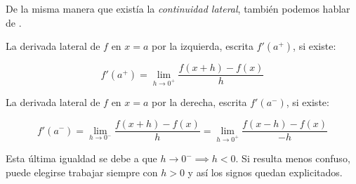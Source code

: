 De la misma manera que existía la \textit{continuidad lateral}, también podemos hablar de . 

\begin{defn}
La derivada lateral de $f$ en $x=a$ por la izquierda, escrita $f'(a^+)$, si existe:

\[f'(a^+) = \lim_{h\to 0^+} \frac{f(x+h)-f(x)}{h}\]

La derivada lateral de $f$ en $x=a$ por la derecha, escrita $f'(a^-)$, si existe:

\[f'(a^-) = \lim_{h\to 0^-} \frac{f(x+h)-f(x)}{h} =  \lim_{h\to 0^+} \frac{f(x-h)-f(x)}{-h}\]

\obs Esta última igualdad se debe a que $h\to 0^-\implies h<0$. Si resulta menos confuso, puede elegirse trabajar siempre con $h>0$ y así los signos quedan explicitados.
\end{defn}

